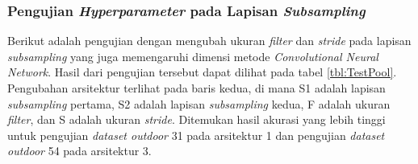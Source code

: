 \subsubsection{Pengujian \textit{Hyperparameter} pada Lapisan \textit{Subsampling}}
\noindent Berikut adalah pengujian dengan mengubah ukuran \textit{filter} dan \textit{stride} pada lapisan \textit{subsampling} yang juga memengaruhi dimensi metode \textit{Convolutional Neural Network}. Hasil dari pengujian tersebut dapat dilihat pada tabel \ref{tbl:TestPool}. Pengubahan arsitektur terlihat pada baris kedua, di mana S1 adalah lapisan \textit{subsampling} pertama, S2 adalah lapisan \textit{subsampling} kedua, F adalah ukuran \textit{filter}, dan S adalah ukuran \textit{stride}. Ditemukan hasil akurasi yang lebih tinggi untuk pengujian \textit{dataset outdoor} 31 pada arsitektur 1 dan pengujian \textit{dataset outdoor} 54 pada arsitektur 3.
